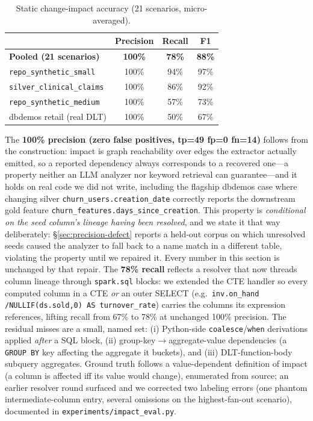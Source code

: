 \documentclass[11pt]{article}
\newcommand{\code}[1]{\texttt{#1}}
\begin{document}
\begin{table}[h]
\centering
\caption{Static change-impact accuracy (21 scenarios, micro-averaged).}
\label{tab:impact}
\small
\begin{tabular}{@{}lccc@{}}
\toprule
 & Precision & Recall & F1 \\
\midrule
\textbf{Pooled (21 scenarios)} & \textbf{100\%} & \textbf{78\%} & \textbf{88\%} \\
\quad \code{repo_synthetic_small} & 100\% & 94\% & 97\% \\
\quad \code{silver_clinical_claims} & 100\% & 86\% & 92\% \\
\quad \code{repo_synthetic_medium} & 100\% & 57\% & 73\% \\
\quad dbdemos retail (real DLT) & 100\% & 50\% & 67\% \\
\bottomrule
\end{tabular}
\end{table}

The \textbf{100\% precision (zero false positives, tp=49 fp=0 fn=14)} follows from
the construction: impact is graph reachability over edges the extractor actually
emitted, so a reported dependency always corresponds to a recovered one---a property
neither an LLM analyzer nor keyword retrieval can guarantee---and it holds on real
code we did not write, including the flagship dbdemos case where changing silver
\code{churn_users.\allowbreak creation_date} correctly reports the downstream gold feature
\code{churn_features.\allowbreak days_since_creation}. This property is \emph{conditional on the
seed column's lineage having been resolved}, and we state it that way deliberately:
\S\ref{sec:precision-defect} reports a held-out corpus on which unresolved seeds
caused the analyzer to fall back to a name match in a different table, violating the
property until we repaired it. Every number in this section is unchanged by that
repair. The \textbf{78\% recall} reflects a
resolver that now threads column lineage through \code{spark.sql} blocks: we extended
the CTE handler so every computed column in a CTE \emph{or} an outer SELECT (e.g.\
\code{inv.\allowbreak on_hand /\allowbreak  NULLIF(ds.\allowbreak sold,0) AS turnover_rate}) carries the columns its
expression references, lifting recall from 67\% to 78\% at unchanged 100\% precision.
The residual misses are a small, named set: (i) Python-side \code{coalesce}/\code{when}
derivations applied \emph{after} a SQL block, (ii) group-key$\rightarrow$aggregate-value
dependencies (a \code{GROUP BY} key affecting the aggregate it buckets), and (iii)
DLT-function-body subquery aggregates. Ground truth follows a value-dependent
definition of impact (a column is affected iff its value would change), enumerated
from source; an earlier resolver round surfaced and we corrected two labeling errors
(one phantom intermediate-column entry, several omissions on the highest-fan-out
scenario), documented in \code{experiments/\allowbreak impact_eval.\allowbreak py}.
\end{document}

